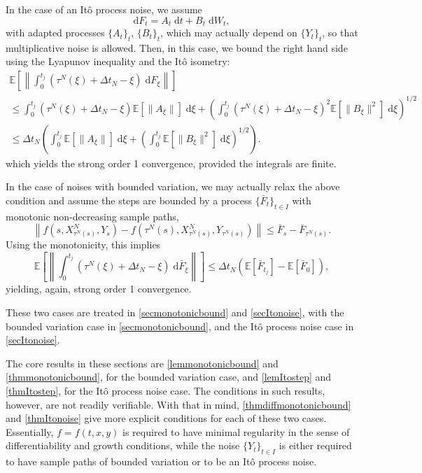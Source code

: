 \documentclass[reqno,12pt]{amsart}
\theoremstyle{plain} %
\theoremstyle{definition} %
\begin{document}
In the case of an It\^o process noise, we assume
\[
    \mathrm{d}F_t = A_t\;\mathrm{d}t + B_t\;\mathrm{d}W_t,
\]
with adapted processes $\{A_t\}_t$, $\{B_t\}_t$, which may actually depend on $\{Y_t\}_t$, so that multiplicative noise is allowed. Then, in this case, we bound the right hand side using the Lyapunov inequality and the It\^o isometry:
\begin{multline*}
    \mathbb{E}\left[\left\| \int_0^{t_j} (\tau^N(\xi) + \Delta t_N - \xi) \;\mathrm{d} F_\xi \right\|\right] \\
    \leq \int_0^{t_j} (\tau^N(\xi) + \Delta t_N - \xi) \mathbb{E}[\|A_\xi\|] \;\mathrm{d}\xi + \left( \int_0^{t_j} (\tau^N(\xi) + \Delta t_N - \xi)^2 \mathbb{E}[\|B_\xi\|^2]\;\mathrm{d} \xi\right)^{1/2} \\ 
    \leq \Delta t_N\left(\int_0^{t_j} \mathbb{E}[\|A_\xi\|]\;\mathrm{d} \xi + \left( \int_0^{t_j} \mathbb{E}[\|B_\xi\|^2] \;\mathrm{d}\xi \right)^{1/2} \right).
\end{multline*}
which yields the strong order 1 convergence, provided the integrals are finite.

In the case of noises with bounded variation, we may actually relax the above condition and assume the steps are bounded by a process $\{\bar F_t\}_{t\in I}$ with monotonic non-decreasing sample paths,
\[
    \left\|f(s, X_{\tau^N(s)}^N, Y_s) - f(\tau^N(s), X_{\tau^N(s)}^N, Y_{\tau^N(s)})\right\| \leq \bar F_s - \bar F_{\tau^N(s)}.
\]
Using the monotonicity, this implies
\[
    \mathbb{E}\left[\left\| \int_0^{t_j} (\tau^N(\xi) + \Delta t_N - \xi) \;\mathrm{d} \bar F_\xi \right\|\right] \leq \Delta t_N \left(\mathbb{E}[\bar F_{t_j}] - \mathbb{E}[\bar F_0]\right),
\]
yielding, again, strong order 1 convergence.

These two cases are treated in \cref{secmonotonicbound} and \cref{secItonoise}, with the bounded variation case in \cref{secmonotonicbound}, and the It\^o process noise case in \cref{secItonoise}.

The core results in these sections are \cref{lemmonotonicbound} and \cref{thmmonotonicbound}, for the bounded variation case, and \cref{lemItostep} and \cref{thmItostep}, for the It\^o process noise case. The conditions in such results, however, are not readily verifiable. With that in mind, \cref{thmdiffmonotonicbound} and \cref{thmItonoise} give more explicit conditions for each of these two cases. Essentially, $f=f(t, x, y)$ is required to have minimal regularity in the sense of differentiability and growth conditions, while the noise $\{Y_t\}_{t\in I}$ is either required to have sample paths of bounded variation or to be an It\^o process noise.
\end{document}
